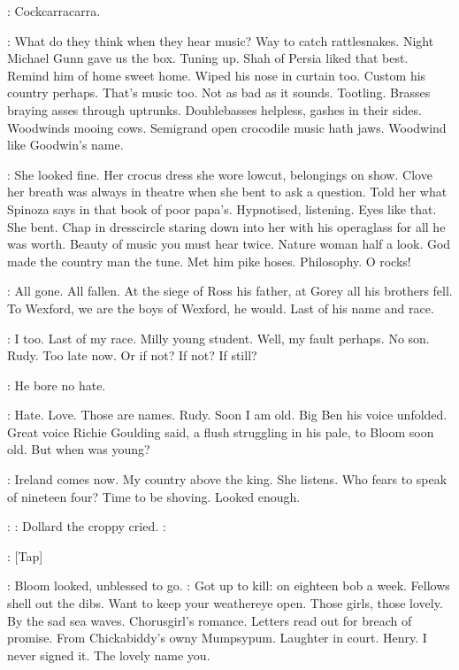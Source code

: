 \BloomInt:
Cockcarracarra.

\BloomInt:
What do they think when they hear music?
Way to catch rattlesnakes.
Night Michael Gunn gave us the box.
Tuning up.
Shah of Persia liked that
best.
Remind him of home sweet home.
Wiped his nose in curtain too.
Custom his country perhaps.
That's music too.
Not as bad as it sounds.
Tootling.
Brasses braying asses through uptrunks.
Doublebasses helpless,
gashes in their sides.
Woodwinds mooing cows.
Semigrand open crocodile
music hath jaws.
Woodwind like Goodwin's name.

\BloomInt:
She looked fine.
Her crocus dress she wore lowcut,
belongings on
show.
Clove her breath was always in theatre when she bent to ask a
question.
Told her what Spinoza says in that book of poor papa's.
Hypnotised,
listening.
Eyes like that.
She bent.
Chap in dresscircle
staring down into her with his operaglass for all he was worth.
Beauty of music you must hear twice.
Nature woman half a look.
God made the
country man the tune.
Met him pike hoses.
Philosophy.
O rocks!

\BloomInt:
All gone.
All fallen.
At the siege of Ross his father,
at Gorey all his
brothers fell.
To Wexford,
we are the boys of Wexford,
he would.
Last of
his name and race.

\BloomInt:
I too.
Last of my race.
Milly young student.
Well,
my fault perhaps.
No son.
Rudy.
Too late now.
Or if not?
If not?
If still?

\BloomInt:
He bore no hate.

\BloomInt:
Hate.
Love.
Those are names.
Rudy.
Soon I am old.
Big Ben his voice
unfolded.
Great voice Richie Goulding said,
a flush struggling in his
pale,
to Bloom soon old.
But when was young?

\BloomInt:
Ireland comes now.
My country above the king.
She listens.
Who
fears to speak of nineteen four?
Time to be shoving.
Looked enough.

\dollard:
:
Dollard the croppy cried.
\dollard:

\stripling:
[Tap]

:
Bloom looked,
unblessed to go.
\BloomInt:
Got up to kill:
on eighteen bob a
week.
Fellows shell out the dibs.
Want to keep your weathereye open.
Those
girls,
those lovely.
By the sad sea waves.
Chorusgirl's romance.
Letters
read out for breach of promise.
From Chickabiddy's owny Mumpsypum.
Laughter in court.
Henry.
I never signed it.
The lovely name you.

